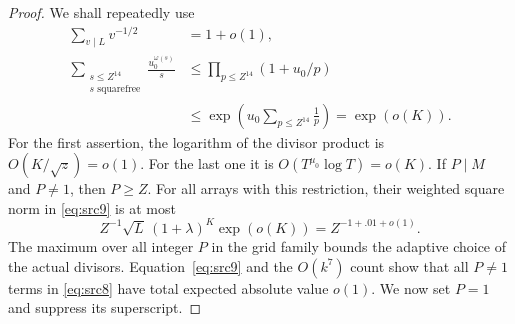\begin{proof}
We shall repeatedly use
\begin{equation}\label{eq:src10}
 \begin{aligned}
 \sum_{v\mid L}v^{-1/2}&=1+o(1),\\
 \sum_{\substack{s\leq Z^{14}\\s\text{ squarefree}}}
       \frac{u_0^{\omega(s)}}s
 &\leq\prod_{p\leq Z^{14}}(1+u_0/p)\\
 &\leq\exp\left(u_0\sum_{p\leq Z^{14}}\frac1p\right)
 =\exp(o(K)).
 \end{aligned}
\end{equation}
For the first assertion, the logarithm of the divisor product is
$O(K/\sqrt z)=o(1)$.  For the last one it is
$O(T^{\mu_0}\log T)=o(K)$.
If $P\mid M$ and $P\ne1$, then $P\geq Z$.
For all arrays with this restriction, their weighted square norm in
\eqref{eq:src9} is at most
\[
 Z^{-1}\sqrt L\,(1+\lambda)^K\exp(o(K))
   =Z^{-1+.01+o(1)}.
\]
The maximum over all integer $P$ in the grid family bounds the
adaptive choice of the actual divisors.  Equation~\eqref{eq:src9}
and the $O(k^7)$ count show that all $P\ne1$ terms in
\eqref{eq:src8} have total expected absolute value $o(1)$.
We now set $P=1$ and suppress its superscript.


\end{proof}
